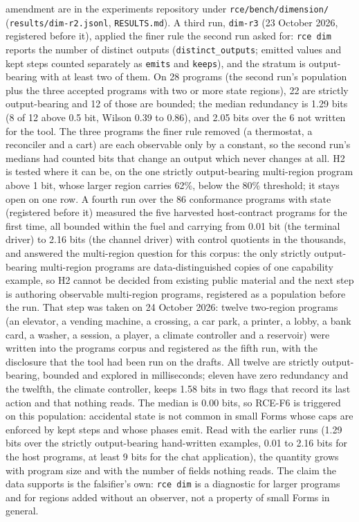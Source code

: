 \documentclass[10pt,letterpaper]{article}
\begin{document}
amendment are in the experiments repository under
\texttt{rce/\allowbreak{}bench/\allowbreak{}dimension/\allowbreak{}} (\texttt{results/\allowbreak{}dim-\allowbreak{}r2.\allowbreak{}jsonl},
\texttt{RESULTS.md}). A third run, \texttt{dim-r3} (23 October 2026,
registered before it), applied the finer rule the second run asked for:
\texttt{rce\ dim} reports the number of distinct outputs
(\texttt{distinct\_\allowbreak{}outputs}; emitted values and kept steps counted
separately as \texttt{emits} and \texttt{keeps}), and the stratum is
output-bearing with at least two of them. On 28 programs (the second
run's population plus the three accepted programs with two or more state
regions), 22 are strictly output-bearing and 12 of those are bounded;
the median redundancy is 1.29 bits (8 of 12 above 0.5 bit, Wilson 0.39
to 0.86), and 2.05 bits over the 6 not written for the tool. The three
programs the finer rule removed (a thermostat, a reconciler and a cart)
are each observable only by a constant, so the second run's medians had
counted bits that change an output which never changes at all. H2 is
tested where it can be, on the one strictly output-bearing multi-region
program above 1 bit, whose larger region carries 62\%, below the 80\%
threshold; it stays open on one row. A fourth run over the 86
conformance programs with state (registered before it) measured the five
harvested host-contract programs for the first time, all bounded within
the fuel and carrying from 0.01 bit (the terminal driver) to 2.16 bits
(the channel driver) with control quotients in the thousands, and
answered the multi-region question for this corpus: the only strictly
output-bearing multi-region programs are data-distinguished copies of
one capability example, so H2 cannot be decided from existing public
material and the next step is authoring observable multi-region
programs, registered as a population before the run. That step was taken
on 24 October 2026: twelve two-region programs (an elevator, a vending
machine, a crossing, a car park, a printer, a lobby, a bank card, a
washer, a session, a player, a climate controller and a reservoir) were
written into the programs corpus and registered as the fifth run, with
the disclosure that the tool had been run on the drafts. All twelve are
strictly output-bearing, bounded and explored in milliseconds; eleven
have zero redundancy and the twelfth, the climate controller, keeps 1.58
bits in two flags that record its last action and that nothing reads.
The median is 0.00 bits, so RCE-F6 is triggered on this population:
accidental state is not common in small Forms whose caps are enforced by
kept steps and whose phases emit. Read with the earlier runs (1.29 bits
over the strictly output-bearing hand-written examples, 0.01 to 2.16
bits for the host programs, at least 9 bits for the chat application),
the quantity grows with program size and with the number of fields
nothing reads. The claim the data supports is the falsifier's own:
\texttt{rce\ dim} is a diagnostic for larger programs and for regions
added without an observer, not a property of small Forms in general.
\end{document}
